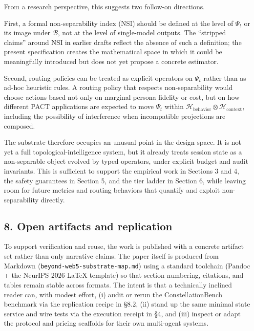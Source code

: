 From a research perspective, this suggests two follow-on directions.

First, a formal non-separability index (NSI) should be defined at the
level of \(\Psi_t\) or its image under \(\mathcal{B}\), not at the level
of single-model outputs. The ``stripped claims'' around NSI in earlier
drafts reflect the absence of such a definition; the present
specification creates the mathematical space in which it could be
meaningfully introduced but does not yet propose a concrete estimator.

Second, routing policies can be treated as explicit operators on
\(\Psi_t\) rather than as ad-hoc heuristic rules. A routing policy that
respects non-separability would choose actions based not only on
marginal persona fidelity or cost, but on how different PACT
applications are expected to move \(\Psi_t\) within
\(\mathcal{H}_{\text{behavior}} \otimes \mathcal{H}_{\text{context}}\),
including the possibility of interference when incompatible projections
are composed.

The substrate therefore occupies an unusual point in the design space.
It is not yet a full topological-intelligence system, but it already
treats session state as a non-separable object evolved by typed
operators, under explicit budget and audit invariants. This is
sufficient to support the empirical work in Sections 3 and 4, the safety
guarantees in Section 5, and the tier ladder in Section 6, while leaving
room for future metrics and routing behaviors that quantify and exploit
non-separability directly.

\subsection{8. Open artifacts and
replication}\label{open-artifacts-and-replication}

To support verification and reuse, the work is published with a concrete
artifact set rather than only narrative claims. The paper itself is
produced from Markdown (\texttt{beyond-web5-substrate-map.md}) using a
standard toolchain (Pandoc + the NeurIPS 2026 LaTeX template) so that
section numbering, citations, and tables remain stable across formats.
The intent is that a technically inclined reader can, with modest
effort, (i) audit or rerun the ConstellationBench benchmark via the
replication recipe in §8.2, (ii) stand up the same minimal state service
and wire tests via the execution receipt in §4, and (iii) inspect or
adapt the protocol and pricing scaffolds for their own multi-agent
systems.

